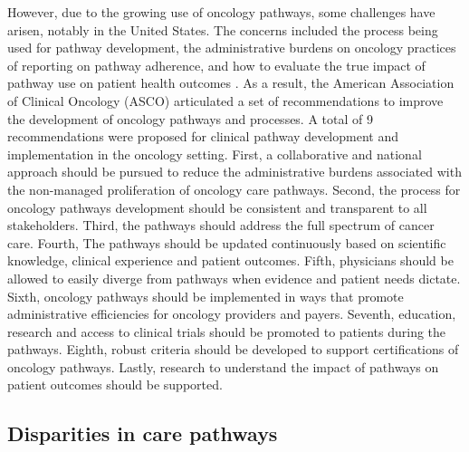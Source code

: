 However, due to the growing use of oncology pathways, some challenges
have arisen, notably in the United States. The concerns included the
process being used for pathway development, the administrative burdens on
oncology practices of reporting on pathway adherence, and how to evaluate the
true impact of pathway use on patient health outcomes \cite{zon_american_2016}.
As a result, the American Association of Clinical Oncology (ASCO) articulated
a set of recommendations to improve the development of oncology pathways and
processes. A total of 9 recommendations were proposed for clinical pathway
development and implementation in the oncology setting.
First, a collaborative and national approach should be pursued to reduce
the administrative burdens associated with the non-managed proliferation of
oncology care pathways. Second, the process for oncology pathways development
should be consistent and transparent to all stakeholders. Third, the pathways
should address the full spectrum of cancer care. Fourth, The pathways should
be updated continuously based on scientific knowledge, clinical experience
and patient outcomes. Fifth, physicians should be allowed to easily diverge
from pathways when evidence and patient needs dictate. Sixth, oncology pathways
should be implemented in ways that promote administrative efficiencies for
oncology providers and payers. Seventh, education, research and access to
clinical trials should be promoted to patients during the pathways. Eighth,
robust criteria should be developed to support certifications of oncology
pathways. Lastly, research to understand the impact of pathways on patient
outcomes should be supported.

\subsection{Disparities in care pathways}


